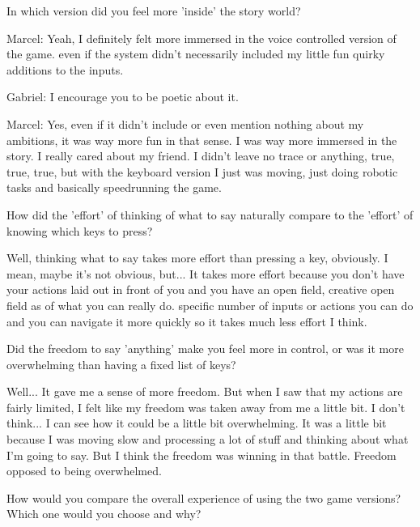 \begin{QandA}
   \item In which version did you feel more 'inside' the story world?
         \begin{answered}
            Marcel: Yeah, I definitely felt more immersed in the voice controlled version of the game.
            even if the system didn't necessarily included my little fun quirky additions to the inputs.


            Gabriel: I encourage you to be poetic about it.


            Marcel: Yes, even if it didn't include or even mention nothing about my ambitions, it was way more fun in that sense.
            I was way more immersed in the story.
            I really cared about my friend.
            I didn't leave no trace or anything, true, true, true, but with the keyboard version I just was moving, just doing robotic tasks and basically speedrunning the game.

           
         \end{answered}

   \item How did the 'effort' of thinking of what to say naturally compare to the 'effort' of knowing which keys to press?

         \begin{answered}
            Well, thinking what to say takes more effort than pressing a key, obviously.
            I mean, maybe it's not obvious, but...
            It takes more effort because you don't have your actions laid out in front of you and you have an open field, creative open field as of what you can really do.
            specific number of inputs or actions you can do and you can navigate it more quickly so it takes much less effort I think.
         \end{answered}

    \item Did the freedom to say 'anything' make you feel more in control, or was it more overwhelming than having a fixed list of keys?

         \begin{answered}
            Well...
            It gave me a sense of more freedom.
            But when I saw that my actions are fairly limited, I felt like my freedom was taken away from me a little bit.
            I don't think...
            I can see how it could be a little bit overwhelming.
            It was a little bit because I was moving slow and processing a lot of stuff and thinking about what I'm going to say.
            But I think the freedom was winning in that battle.
            Freedom opposed to being overwhelmed.
         \end{answered}
    \item How would you compare the overall experience of using the two game versions? Which one would you choose and why?


\end{QandA}
